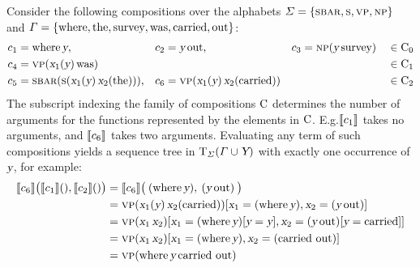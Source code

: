 \documentclass[../../document.tex]{subfiles}
\begin{document}
    \begin{example}\label{ex:dcp:comp}
        Consider the following compositions over the alphabets \(\varSigma = \{ \textsc{sbar}, \textsc{s}, \textsc{vp}, \textsc{np} \}\) and \(\varGamma = \{\text{where}, \text{the}, \text{survey}, \text{was}, \text{carried}, \text{out}\}\):
        \begin{align*}
            c_1 &= \text{where} \, \textsl{y},
            &c_2 &= \textsl{y} \, \text{out},
            &c_3 &= \textsc{np} (\textsl{y} \, \text{survey}) && \in \mathrm{C}_0\\
            c_4 &= \textsc{vp}(\textsl{x}_1(\textsl{y}) \, \text{was}) && && && \in \mathrm{C}_1 \\
            c_5 &= \textsc{sbar} (\textsc{s} (\textsl{x}_1(\textsl{y}) \, \textsl{x}_2(\text{the}))),
            &c_6 &= \textsc{vp}(\textsl{x}_1(\textsl{y}) \, \textsl{x}_2(\text{carried})) && && \in \mathrm{C}_2
        \end{align*}
        The subscript indexing the family of compositions \(\mathrm{C}\) determines the number of arguments for the functions represented by the elements in \(\mathrm{C}\).
        E.g.\@ \(\llbracket c_1\rrbracket\) takes no arguments, and \(\llbracket c_6\rrbracket\) takes two arguments.
        Evaluating any term of such compositions yields a sequence tree in \(\operatorname{T}_\varSigma(\varGamma \cup \textsl{Y})\) with exactly one occurrence of \(\textsl{y}\), for example:
        \begin{align*}
            \llbracket c_6\rrbracket \big( \llbracket c_1\rrbracket(), \llbracket c_2\rrbracket() \big)
            &= \llbracket c_6\rrbracket \big( \: (\text{where} \, \textsl{y}), \: (\textsl{y} \, \text{out}) \: \big) \\
            &= \textsc{vp}(\textsl{x}_1(\textsl{y}) \, \textsl{x}_2(\text{carried}))[\textsl{x}_1=(\text{where} \, \textsl{y}), \textsl{x}_2=(\textsl{y} \, \text{out})] \\
            &= \textsc{vp}(\textsl{x}_1 \, \textsl{x}_2)[\textsl{x}_1=(\text{where} \, \textsl{y})[\textsl{y}=\textsl{y}], \textsl{x}_2=(\textsl{y} \, \text{out})[\textsl{y}=\text{carried}]] \\
            &= \textsc{vp}(\textsl{x}_1 \, \textsl{x}_2)[\textsl{x}_1=(\text{where} \, \textsl{y}), \textsl{x}_2=(\text{carried out})] \\
            &= \textsc{vp}(\text{where} \, \textsl{y} \, \text{carried out})
        \end{align*}
    \end{example}
\end{document}
